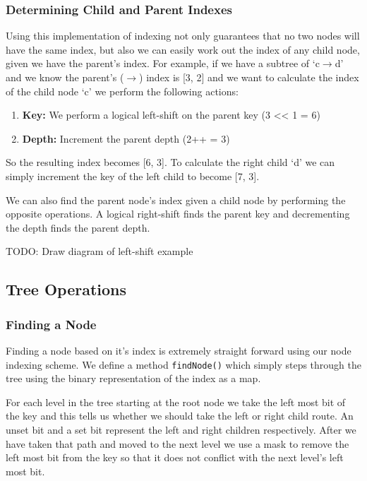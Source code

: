 \documentclass{report}
\begin{document}
\subsubsection{Determining Child and Parent Indexes}

Using this implementation of indexing not only guarantees that no two nodes will have the same index, but also we can easily work out the index of any child node, given we have the parent's index. For example, if we have a subtree of `c$\to$d' and we know the parent's ($\to$) index is [3, 2] and we want to calculate the index of the child node `c' we perform the following actions:

\begin{enumerate}
    \item \textbf{Key:} We perform a logical left-shift on the parent key (3 << 1 = 6)
    \item \textbf{Depth:} Increment the parent depth (2++ = 3)
\end{enumerate}

So the resulting index becomes [6, 3]. To calculate the right child `d' we can simply increment the key of the left child to become [7, 3].

We can also find the parent node's index given a child node by performing the opposite operations. A logical right-shift finds the parent key and decrementing the depth finds the parent depth.

TODO: Draw diagram of left-shift example

\subsection{Tree Operations}
\label{sub:tree_operations}

\subsubsection{Finding a Node}

Finding a node based on it's index is extremely straight forward using our node indexing scheme. We define a method {\tt findNode()} which simply steps through the tree using the binary representation of the index as a map.

For each level in the tree starting at the root node we take the left most bit of the key and this tells us whether we should take the left or right child route. An unset bit and a set bit represent the left and right children respectively. After we have taken that path and moved to the next level we use a mask to remove the left most bit from the key so that it does not conflict with the next level's left most bit.
\end{document}
